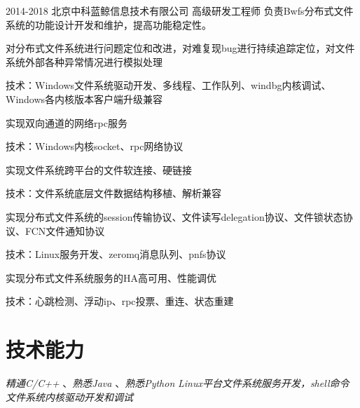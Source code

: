 \documentclass[10pt]{article} %
\begin{document}
\job
{2014-2018}
{北京中科蓝鲸信息技术有限公司}
{高级研发工程师}
{负责Bwfs分布式文件系统的功能设计开发和维护，提高功能稳定性。}
{\begin{itemize-noindent}
\item{对分布式文件系统进行问题定位和改进，对难复现bug进行持续追踪定位，对文件系统外部各种异常情况进行模拟处理}
\item[]{技术：Windows文件系统驱动开发、多线程、工作队列、windbg内核调试、Windows各内核版本客户端升级兼容}
\item{实现双向通道的网络rpc服务}
\item[]{技术：Windows内核socket、rpc网络协议}
\item{实现文件系统跨平台的文件软连接、硬链接}
\item[]{技术：文件系统底层文件数据结构移植、解析兼容}
\item{实现分布式文件系统的session传输协议、文件读写delegation协议、文件锁状态协议、FCN文件通知协议}
\item[]{技术：Linux服务开发、zeromq消息队列、pnfs协议}
\item{实现分布式文件系统服务的HA高可用、性能调优}
\item[]{技术：心跳检测、浮动ip、rpc投票、重连、状态重建}
\end{itemize-noindent}
}
\section{技术能力}
{
\textit{精通C/C++} 、\textit{熟悉Java} 、\textit{熟悉Python}
}
{
\textit{Linux平台文件系统服务开发，shell命令}
}
{
\textit{文件系统内核驱动开发和调试}
}
\end{document}
